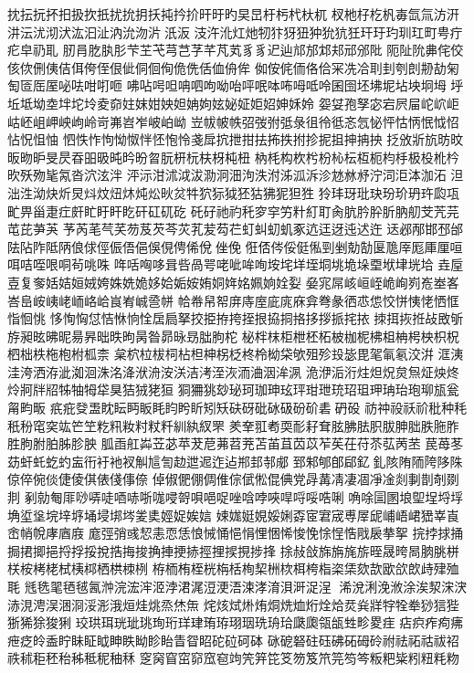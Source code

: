 抌抎抏抔抇扱扻扺扰抁抈扷扽扲扴旰旴旳旲旵杅杇杙杕杌
杈杝杍杚杋毐氙氚汸汧汫沄沋沏汱汯汩沚汭沇沕沜汦汳
汥汻沎灴灺牣犿犽狃狆狁犺狅玕玗玓玔玒町甹疔疕皁礽耴
肕肙肐肒肜芐芏芅芎芑芓芊芃芄⾘豸迉辿邟邡邥邞邧邠阰
阨阯阭丳侘佼侅佽侀侇佶佴侉侄佷佌侗佪侚佹侁佸侐侜侔
侞侒侂侕佫佮冞冼冾刵刲刳剆刱劼匊匋匼厒厔咇呿咁咑咂
咈呫呺呾呥呬呴呦咍呯呡呠咘呣呧呤囷囹坯坲坭坫坱坰坶
垀坵坻坳坴坢坨坽夌奅妵妺姏姎妲姌姁妶妼姃姖妱妽姀姈
妴姇孢孥宓宕屄屇岮岤岠岵岯岨岬岟岣岭岢岪岧岝岥岶岰
岦帗帔帙弨弢弣弤彔徂彾彽忞忥怭怦怙怲怋怴怊怗怳怚怞
怬怢怍怐怮怓怑怌怉怜戔戽抭抴拑抾抪抶拊抮抳抯抻抩抰
抸攽斨斻昉旼昄昒昈旻昃昋昍昅旽昑昐曶朊枅杬枎枒杶杻
枘枆构杴枍枌杺枟枑枙枃杽极杸杹枔欥殀歾毞氝沓泬泫泮
泙沶泔沭泧沷泐泂沺泃泆泭泲泒泝沴沊沝沀泞泀洰泍泇沰
泹泏泩泑炔炘炅炓炆炄炑炖炂炚炃牪狖狋狘狉狜狒狔狚狌
狑玤玡玭玦玢玠玬玝瓝瓨甿畀甾疌疘皯盳盱盰盵矸矼矹矻
矺矷祂礿秅穸穻竻籵糽耵肏肮肣肸肵肭舠芠苀芫芚芘芛芵
芧芮芼芞芺芴芨芡芩苂芤苃芶芢虰虯虭虮豖迒迋迓迍迖迕
迗邲邴邯邳邰阹阽阼阺陃俍俅俓侲俉俋俁俔俜俙侻侳俛
俇俖侺俀侹俬剄剉勀勂匽卼厗厖厙厘咺咡咭咥哏哃茍咷咮
哖咶哅哆咠呰咼咢咾呲哞咰垵垞垟垤垌垗垝垛垔垘垏垙垥
垚垕壴复奓姡姞姮娀姱姝姺姽姼姶姤姲姷姛姩姳姵姠姾姴
姭宨屌峐峘峌峗峋峛峞峚峉峇峊峖峓峔峏峈峆峎峟峸巹帡
帢帣帠帤庰庤庢庛庣庥弇弮彖徆怷怹恔恲恞恅恓恇恉恛恌
恀恂恟怤恄恘恦恮扂扃拏挍挋拵挎挃拫拹挏挌拸拶挀挓挔
拺挕拻拰敁敃斪斿昶昡昲昵昜昦昢昳昫昺昝昴昹昮朏朐柁
柲柈枺柜枻柸柘柀枷柅柫柤柟枵柍枳柷柶柮柣柂枹柎柧柰
枲柼柆柭柌枮柦柛柺柉柊柃柪柋欨殂殄殶毖毘毠氠氡洨洴
洭洟洼洿洒洊泚洳洄洙洺洚洑洀洝浂洁洘洷洃洏浀洇洠洬
洈洢洉洐炷炟炾炱炰炡炴炵炩牁牉牊牬牰牳牮狊狤狨狫狟
狪狦狣玅珌珂珈珅玹玶玵玴珫玿珇玾珃珆玸珋瓬瓮甮畇畈
疧疪癹盄眈眃眄眅眊盷盻盺矧矨砆砑砒砅砐砏砎砉砃砓
祊祌祋祅祄秕种秏秖秎窀穾竑笀笁籺籸籹籿粀粁紃紈紁罘
羑羍羾耇耎耏耔耷胘胇胠胑胈胂胐胅胣胙胜胊胕胉胏胗胦
胍臿舡芔苙苾苹茇苨茀苕茺苫苖苴苬苡苲苵茌苻苶苰苪苤
苠苺苳苭虷虴虼虳衁衎衧衪衩觓訄訇赲迣迡迮迠郱邽邿郕
郅邾郇郋郈釔釓陔陏陑陓陊陎倞倅倇倓倢倰倛俵俴倳倷
倬俶俷倗倜倠倧倵倯倱倎党冔冓凊凄凅凈凎剡剚剒剞剟剕
剢勍匎厞唦哢唗唒哧哳哤唚哿唄唈哫唑唅哱唊哻哷哸哠唎
唃唋圁圂埌堲埕埒垺埆垽垼垸垶垿埇埐垹埁夎奊娙娖娭娮
娕娏娗娊娞娳孬宧宭宬尃屖屔峬峿峮峱峷崀峹帩帨庨庮庪
庬弳弰彧恝恚恧恁悢悈悀悒悁悝悃悕悛悗悇悜悎戙扆拲挐
捖挬捄捅挶捃揤挹捋捊挼挩捁挴捘捔捙挭捇挳捚捑挸捗捀
捈敊敆旆旃旄旂晊晟晇晑朒朓栟栚桉栲栳栻桋桏栖栱栜栵
栫栭栯桎桄栴栝栒栔栦栨栮桍栺栥栠欬欯欭欱欴歭肂殈毦
毤毨毣毢毧氥浺浣浤浶洍浡涒浘浢浭浯涑涍淯浿涆浞浧
浠涗浰浼浟涂涘洯浨涋浾涀涄洖涃浻浽浵涐烜烓烑烝烋缹
烢烗烒烞烠烔烍烅烆烇烚烎烡牂牸牷牶猀狺狴狾狶狳狻猁
珓珙珥珖玼珧珣珩珜珒珛珔珝珚珗珘珨瓞瓟瓴瓵甡畛畟疰
痁疻痄痀疿疶疺皊盉眝眛眐眓眒眣眑眕眙眚眢眧砣砬砢砵
砯砨砮砫砡砩砳砪砱祔祛祏祜祓祒祑秫秬秠秮秭秪秜秞秝
窆窉窅窋窌窊窇竘笐笄笓笅笏笈笊笎笉笒粄粑粊粌粈粍粅
